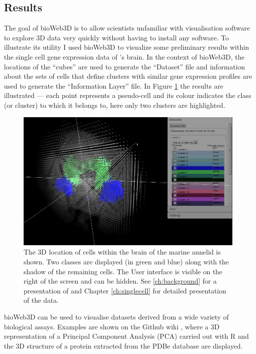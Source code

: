 	\subsection{Results}

	The goal of bioWeb3D is to allow scientists unfamiliar with visualisation software to explore 3D data very quickly without having to install any software.
	To illustrate its utility I used bioWeb3D to visualize some preliminary results within the single cell gene expression data of \platy{}'s brain. In the context of bioWeb3D, the locations of the ``cubes'' are used to generate the ``Dataset'' file and information about the sets of cells that define clusters with similar gene expression profiles are used to generate the ``Information Layer'' file. In Figure \ref{fig:bioweb3d} the results are illustrated ---  each point represents a pseudo-cell and its colour indicates the class (or cluster) to which it belongs to, here only two clusters are highlighted. 
	
	\begin{figure}[h]
\centerline{\includegraphics[width=\linewidth]{gfx/chapter3/bioweb3d.png}}
\caption{The 3D location of cells within the brain of the marine annelid \platyfull{} is shown. Two classes are displayed (in green and blue) along with the shadow of the remaining cells. The User interface is visible on the right of the screen and can be hidden. See \ref{ch:background} for a presentation of \platy{} and Chapter \ref{ch:singlecell} for detailed presentation of the data.}\label{fig:bioweb3d}
	\end{figure}

	bioWeb3D can be used to visualise datasets derived from a wide variety of biological assays. Examples are shown on the Github wiki \citep{github}, where a 3D representation of a Principal Component Analysis (PCA) carried out with R and the 3D structure of a protein extracted from the PDBe database are displayed.\\
	
